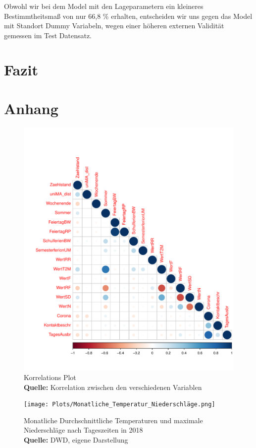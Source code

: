 \documentclass[a4paper,12pt]{thesis}
\newcommand*{\captionsource}[2]{%
	\caption[{#1}]{%
		#1%
		\\\hspace{\linewidth}%
		\textbf{Quelle:} #2%
	}%
}
\begin{document}
Obwohl wir bei dem Model mit den Lageparametern ein kleineres Bestimmtheitsmaß von nur 66,8 \% erhalten, entscheiden wir uns gegen das Model mit Standort Dummy Variabeln, wegen einer höheren externen Validität gemessen im Test Datensatz.

\chapter{Fazit}

\chapter{Anhang}

\begin{figure}[!ht]
	\centering
	\includegraphics[width=\textwidth]{Plots/Corr_Plot.pdf}
	\captionsource{Korrelations Plot}{
		Korrelation zwischen den verschiedenen Variablen
	}
	\label{fig:meine-grafik5}
\end{figure}

\begin{figure}[!ht]
	\centering
	\texttt{[image: Plots/Monatliche\_Temperatur\_Niederschläge.png]}
	\captionsource{Monatliche Durchschnittliche Temperaturen und maximale Niederschläge nach Tageszeiten in 2018}{
		DWD, eigene Darstellung
	}
	\label{fig:meine-grafik5}
\end{figure}
\end{document}

